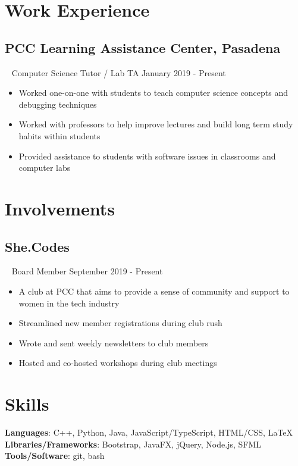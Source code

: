 \documentclass{article}
\newcommand{\resumesection}[3]{
    \subsection*{#1}
    \ 
    \footnotesize
    \textcolor{wordgrey}{#2}
    \normalsize
    \hfill
    \textcolor{wordgrey}{#3}
}
\begin{document}
\section*{Work Experience}
\resumesection{PCC Learning Assistance Center, Pasadena}{Computer Science Tutor / Lab TA}{January 2019 - Present}
\begin{itemize}
    \item Worked one-on-one with students to teach computer science concepts and debugging techniques
    \item Worked with professors to help improve lectures and build long term study habits within students
    \item Provided assistance to students with software issues in classrooms and computer labs
\end{itemize}
\hfill

\section*{Involvements}
\resumesection{She.Codes}{Board Member}{September 2019 - Present}
\begin{itemize}
    \item A club at PCC that aims to provide a sense of community and support to women in the tech industry
    \item Streamlined new member registrations during club rush
    \item Wrote and sent weekly newsletters to club members
    \item Hosted and co-hosted workshops during club meetings
\end{itemize}
\hfill

\section*{Skills}
\textbf{Languages}: C++, Python, Java, JavaScript/TypeScript, HTML/CSS, {\selectfont\LaTeX}\\
\textbf{Libraries/Frameworks}: Bootstrap, JavaFX, jQuery, Node.js, SFML\\
\textbf{Tools/Software}: git, bash
\end{document}
